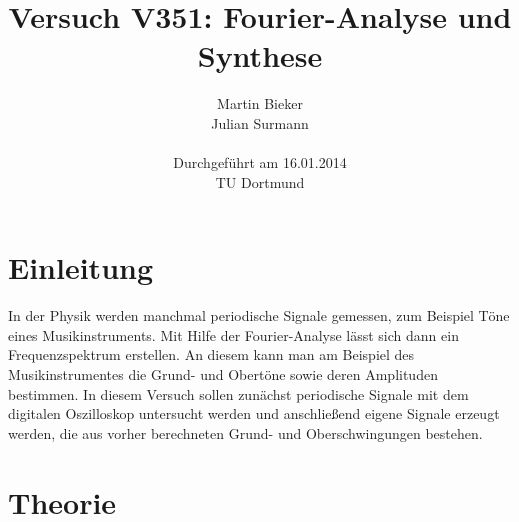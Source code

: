 \documentclass[11pt,ngerman,a4paper]{article}
\title{\textbf{Versuch V351: Fourier-Analyse und Synthese}}
\author{Martin Bieker\\
		Julian Surmann\\
		\\
		Durchgef\"{u}hrt am 16.01.2014\\
		TU Dortmund}
\date{}
\begin{document}
\renewcommand\tablename{Tabelle}
\renewcommand\figurename{Abbildung}
\maketitle
\thispagestyle{empty}
\newpage
\clearpage
\setcounter{page}{1}


\section{Einleitung}
In der Physik werden manchmal periodische Signale gemessen, zum Beispiel Töne eines Musikinstruments. Mit Hilfe der Fourier-Analyse lässt sich dann ein Frequenzspektrum erstellen. An diesem kann man am Beispiel des Musikinstrumentes die Grund- und Obertöne sowie deren Amplituden bestimmen.
In diesem Versuch sollen zunächst periodische Signale mit dem digitalen Oszilloskop untersucht werden und anschließend eigene Signale erzeugt werden, die aus vorher berechneten Grund- und Oberschwingungen bestehen.
\section{Theorie}
\end{document}
